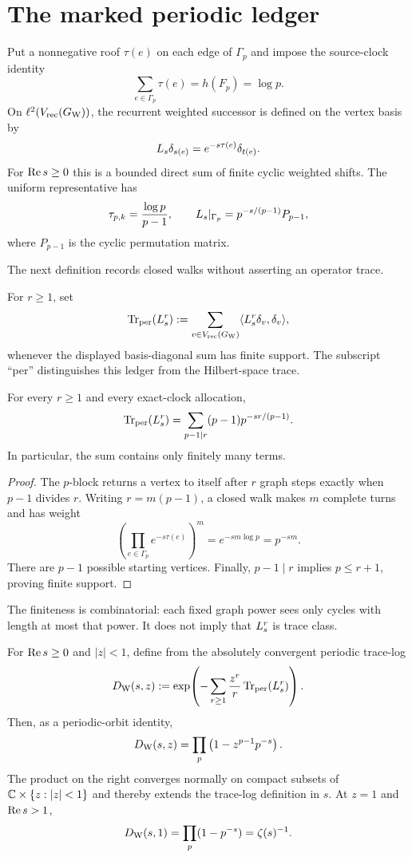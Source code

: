 \section{The marked periodic ledger}
\label{sec:periodic-product}

Put a nonnegative roof $\tau(e)$ on each edge of $\Gamma_p$ and impose the
source-clock identity
\[
  \sum_{e\in\Gamma_p}\tau(e)=h(F_p)=\log p.
\]
On $\ell^2(V_{\mathrm{rec}}(G_{\mathrm W}))$, the recurrent weighted successor is defined on the
vertex basis by
\[
  L_s\delta_{s(e)}=e^{-s\tau(e)}\delta_{t(e)}.
\]
For $\operatorname{Re} s\geq0$ this is a bounded direct sum of finite cyclic weighted
shifts.  The uniform representative has
\[
  \tau_{p,k}=\frac{\log p}{p-1},\qquad
  L_s|_{\Gamma_p}=p^{-s/(p-1)}P_{p-1},
\]
where $P_{p-1}$ is the cyclic permutation matrix.

The next definition records closed walks without asserting an operator trace.

\begin{definition}
For $r\geq1$, set
\[
  \operatorname{Tr}_{\mathrm{per}}(L_s^r)
  :=\sum_{v\in V_{\mathrm{rec}}(G_{\mathrm W})}
  \langle L_s^r\delta_v,\delta_v\rangle,
\]
whenever the displayed basis-diagonal sum has finite support.  The subscript
``per'' distinguishes this ledger from the Hilbert-space trace.
\end{definition}

\begin{proposition}
\label{prop:periodic-ledger}
For every $r\geq1$ and every exact-clock allocation,
\[
  \operatorname{Tr}_{\mathrm{per}}(L_s^r)
  =\sum_{p-1\mid r}(p-1)p^{-sr/(p-1)}.
\]
In particular, the sum contains only finitely many terms.
\end{proposition}

\begin{proof}
The $p$-block returns a vertex to itself after $r$ graph steps exactly when
$p-1$ divides $r$.  Writing $r=m(p-1)$, a closed walk makes $m$ complete
turns and has weight
\[
  \left(\prod_{e\in\Gamma_p}e^{-s\tau(e)}\right)^m
  =e^{-sm\log p}=p^{-sm}.
\]
There are $p-1$ possible starting vertices.  Finally, $p-1\mid r$ implies
$p\leq r+1$, proving finite support.
\end{proof}

The finiteness is combinatorial: each fixed graph power sees only cycles with
length at most that power.  It does not imply that $L_s^r$ is trace class.

\begin{proposition}
\label{prop:marked-product}
For $\operatorname{Re} s\geq0$ and $|z|<1$, define from the absolutely convergent
periodic trace-log
\[
  D_{\mathrm W}(s,z):=\exp\!\left(
    -\sum_{r\geq1}\frac{z^r}{r}\operatorname{Tr}_{\mathrm{per}}(L_s^r)\right).
\]
Then, as a periodic-orbit identity,
\[
  D_{\mathrm W}(s,z)=\prod_p\left(1-z^{p-1}p^{-s}\right).
\]
The product on the right converges normally on compact subsets of
$\mathbb C\times\{z:|z|<1\}$ and thereby extends the trace-log definition in $s$.
At $z=1$ and $\operatorname{Re} s>1$,
\[
  D_{\mathrm W}(s,1)=\prod_p(1-p^{-s})=\zeta(s)^{-1}.
\]
\end{proposition}

